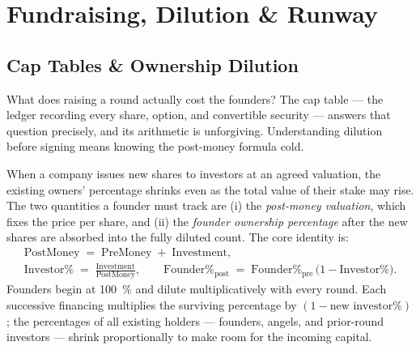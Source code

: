 \chapter{Fundraising, Dilution \& Runway}\label{ch:fundraising-and-dilution}


\section{Cap Tables \& Ownership Dilution}\label{sec:cap-table}

What does raising a round actually cost the founders? The cap table --- the ledger recording
every share, option, and convertible security --- answers that question precisely, and its
arithmetic is unforgiving. Understanding dilution before signing means knowing the
post-money formula cold.

When a company issues new shares to investors at an agreed valuation, the existing owners'
percentage shrinks even as the total value of their stake may rise. The two quantities a
founder must track are (i) the \emph{post-money valuation}, which fixes the price per share,
and (ii) the \emph{founder ownership percentage} after the new shares are absorbed into the
fully diluted count. The core identity is:
\begin{equation}\label{eq:post-money}
\begin{gathered}
  \mathrm{PostMoney} \;=\; \mathrm{PreMoney} \;+\; \mathrm{Investment}, \\
  \text{Investor\%} \;=\; \frac{\mathrm{Investment}}{\mathrm{PostMoney}}, \qquad
  \text{Founder\%}_{\mathrm{post}} \;=\; \text{Founder\%}_{\mathrm{pre}}\,\bigl(1 - \text{Investor\%}\bigr).
\end{gathered}
\end{equation}
Founders begin at \qty{100}{\percent} and dilute multiplicatively with every round. Each
successive financing multiplies the surviving percentage by \((1 - \text{new investor\%})\);
the percentages of all existing holders --- founders, angels, and prior-round investors ---
shrink proportionally to make room for the incoming capital.

